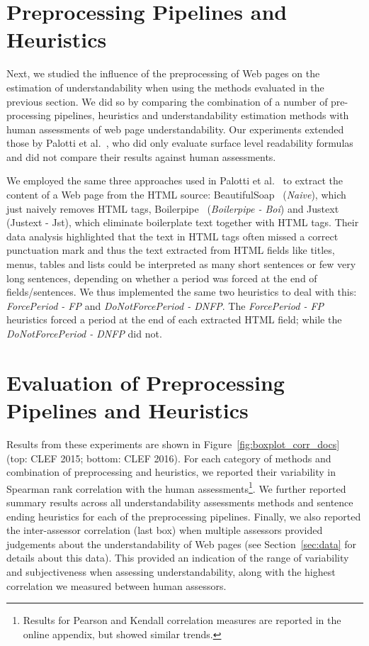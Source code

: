 \section{Preprocessing Pipelines and Heuristics}

Next, we studied the influence of the preprocessing of Web pages on the estimation of understandability when using the methods evaluated in the previous section. We did so by comparing the combination of a number of pre-processing pipelines, heuristics and understandability estimation methods with human assessments of web page understandability. 
Our experiments extended those by Palotti et al.~\cite{palotti15}, who did only evaluate surface level readability formulas and did not compare their results against human assessments. 

We employed the same three approaches used in Palotti et al.~\cite{palotti15} to extract the content of a Web page from the HTML source: BeautifulSoap~\cite{bs4} (\textit{Naive}), which just naively removes HTML tags, Boilerpipe~\cite{kohlschutter10} (\textit{Boilerpipe - Boi}) and Justext~\cite{jan11} ({Justext - Jst}), which eliminate boilerplate text together with HTML tags. 
Their data analysis highlighted that the text in HTML tags often missed a correct punctuation mark and thus the text extracted from HTML fields like titles, menus, tables and lists could be interpreted as many short sentences or few very long sentences, depending on whether a period was forced at the end of fields/sentences. We thus implemented the same two heuristics to deal with this: \textit{ForcePeriod - FP} and \textit{DoNotForcePeriod - DNFP}. The \textit{ForcePeriod - FP} heuristics forced a period at the end of each extracted HTML field; while the \textit{DoNotForcePeriod - DNFP} did not. 


\section{Evaluation of Preprocessing Pipelines and Heuristics}
\label{sec:which_preprocessing}
Results from these experiments are shown in Figure~\ref{fig:boxplot_corr_docs} (top: CLEF 2015; bottom: CLEF 2016). For each category of methods and combination of preprocessing and heuristics, we reported their variability in Spearman rank correlation with the human assessments\footnote{Results for Pearson and Kendall correlation measures are reported in the online appendix, but showed similar trends.}. We further reported summary results across all understandability assessments methods and sentence ending heuristics for each of the preprocessing pipelines. Finally, we also reported the inter-assessor correlation (last box) when multiple assessors provided judgements about the understandability of Web pages (see Section~\ref{sec:data} for details about this data). This provided an indication of the range of variability and subjectiveness when assessing understandability, along with the highest correlation we measured between human assessors. 

